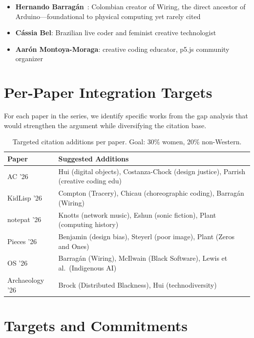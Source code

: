 \documentclass[10pt,letterpaper,twocolumn]{article}
\begin{document}
\begin{itemize}
  \item \textbf{Hernando Barrag\'an}~\citep{barragan2004wiring}: Colombian creator of Wiring, the direct ancestor of Arduino---foundational to physical computing yet rarely cited
  \item \textbf{C\'assia Bel}: Brazilian live coder and feminist creative technologist
  \item \textbf{Aar\'on Montoya-Moraga}: creative coding educator, p5.js community organizer
\end{itemize}


\section{Per-Paper Integration Targets}

For each paper in the series, we identify specific works from the gap analysis that would strengthen the argument while diversifying the citation base.

\begin{table}[h]
\small
\centering
\begin{tabularx}{\columnwidth}{lX}
\toprule
\textbf{Paper} & \textbf{Suggested Additions} \\
\midrule
AC '26 & Hui (digital objects), Costanza-Chock (design justice), Parrish (creative coding edu) \\
\addlinespace
KidLisp '26 & Compton (Tracery), Chicau (choreographic coding), Barrag\'an (Wiring) \\
\addlinespace
notepat '26 & Knotts (network music), Eshun (sonic fiction), Plant (computing history) \\
\addlinespace
Pieces '26 & Benjamin (design bias), Steyerl (poor image), Plant (Zeros and Ones) \\
\addlinespace
OS '26 & Barrag\'an (Wiring), McIlwain (Black Software), Lewis et al.\ (Indigenous AI) \\
\addlinespace
Archaeology '26 & Brock (Distributed Blackness), Hui (technodiversity) \\
\bottomrule
\end{tabularx}
\caption{Targeted citation additions per paper. Goal: 30\% women, 20\% non-Western.}
\label{tab:targets}
\end{table}


\section{Targets and Commitments}
\end{document}
